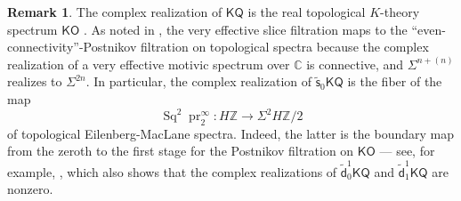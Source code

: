 \documentclass[11pt,hyp,english]{article}
\newcommand{\Z}{\mathbb{Z}}
\newcommand{\KGL}{\mathsf{KGL}}
\newcommand{\KQ}{\mathsf{KQ}}
\newcommand{\KO}{\mathsf{KO}}
\newcommand{\MZ}{\mathsf{M}\Z}
\newcommand{\Sq}{\operatorname{Sq}}
\newcommand{\pr}{\operatorname{pr}}
\newcommand{\s}{\mathsf{s}}
\newcommand{\vs}{\tilde{\mathsf{s}}}
\newcommand{\f}{\mathsf{f}}
\newcommand{\vd}{{\tilde{\mathsf{d}}}}
\newcommand{\Hyper}{\mathsf{Hyp}}
\theoremstyle{definition}
\newtheorem{remark}[theorem]{Remark}
\begin{document}

\begin{remark}\label{rem:top-real-diff}
The complex realization of $\KQ$ is the real topological $K$-theory spectrum $\KO$ \cite[Lemma 2.13]{aro}.
As noted in \cite[§3.3]{grso}, 
the very effective slice filtration maps to the ``even-connectivity''-Postnikov filtration on topological spectra 
because the complex realization of a very effective motivic spectrum over $\mathbb{C}$ is connective, 
and $\Sigma^{n+(n)}$ realizes to $\Sigma^{2n}$. 
In particular, 
the complex realization of $\vs_{0}\KQ $ is the fiber of the map
\[ 
\Sq^2\pr^\infty_2 \colon H\Z\to \Sigma^2 H\Z/2
\]
of topological Eilenberg-MacLane spectra. 
Indeed, the latter is the boundary map from the zeroth to the first stage for the Postnikov filtration on $\KO$ --- see, for example, \cite[(1.3)]{fujii},
which also shows that the complex realizations of $\vd^1_0\KQ $ and $\vd_1^1\KQ $ are nonzero.
\end{remark}
\end{document}
